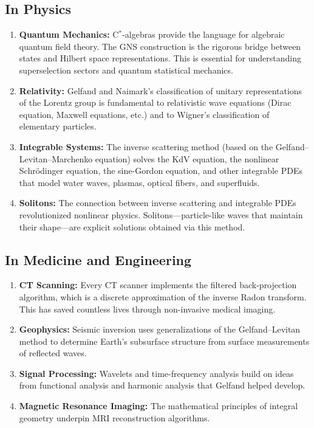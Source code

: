 \subsection{In Physics}

\begin{enumerate}
    \item \textbf{Quantum Mechanics:} C$^*$-algebras provide the language for algebraic quantum field theory. The GNS construction is the rigorous bridge between states and Hilbert space representations. This is essential for understanding superselection sectors and quantum statistical mechanics.
    
    \item \textbf{Relativity:} Gelfand and Naimark's classification of unitary representations of the Lorentz group is fundamental to relativistic wave equations (Dirac equation, Maxwell equations, etc.) and to Wigner's classification of elementary particles.
    
    \item \textbf{Integrable Systems:} The inverse scattering method (based on the Gelfand--Levitan--Marchenko equation) solves the KdV equation, the nonlinear Schr\"odinger equation, the sine-Gordon equation, and other integrable PDEs that model water waves, plasmas, optical fibers, and superfluids.
    
    \item \textbf{Solitons:} The connection between inverse scattering and integrable PDEs revolutionized nonlinear physics. Solitons---particle-like waves that maintain their shape---are explicit solutions obtained via this method.
\end{enumerate}

\subsection{In Medicine and Engineering}

\begin{enumerate}
    \item \textbf{CT Scanning:} Every CT scanner implements the filtered back-projection algorithm, which is a discrete approximation of the inverse Radon transform. This has saved countless lives through non-invasive medical imaging.
    
    \item \textbf{Geophysics:} Seismic inversion uses generalizations of the Gelfand--Levitan method to determine Earth's subsurface structure from surface measurements of reflected waves.
    
    \item \textbf{Signal Processing:} Wavelets and time-frequency analysis build on ideas from functional analysis and harmonic analysis that Gelfand helped develop.
    
    \item \textbf{Magnetic Resonance Imaging:} The mathematical principles of integral geometry underpin MRI reconstruction algorithms.
\end{enumerate}

